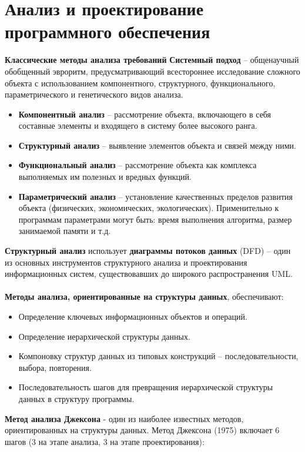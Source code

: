 \documentclass[a4paper, 12pt]{report}
\numberwithin{equation}{section}
\begin{document}
    \section{Анализ и проектирование программного обеспечения}
    \textbf{Классические методы анализа требований}
    \textbf{Системный подход} – общенаучный обобщенный эвроритм, предусматривающий всестороннее исследование сложного объекта с использованием компонентного, структурного, функционального, параметрического и генетического видов анализа.
        \begin{itemize}
            \item \textbf{Компонентный анализ} -- рассмотрение объекта, включающего в себя составные элементы и входящего в систему более высокого ранга.
            \item \textbf{Структурный анализ} -- выявление элементов объекта и связей между ними. 
            \item \textbf{Функциональный анализ} -- рассмотрение объекта как комплекса выполняемых им полезных и вредных функций.
            \item \textbf{Параметрический анализ} -- установление качественных пределов развития объекта (физических, экономических, экологических). Применительно к программам параметрами могут быть: время выполнения алгоритма, размер занимаемой памяти и т.д.
        \end{itemize}
    \textbf{Структурный анализ} использует \textbf{диаграммы потоков данных} (DFD) -- один из основных инструментов структурного анализа и проектирования информационных систем, существовавших до широкого распространения UML.
    \\\\
    \textbf{Методы анализа, ориентированные на структуры данных}, обеспечивают:
    \begin{itemize}
        \item Определение ключевых информационных объектов и операций.
        \item Определение иерархической структуры данных.
        \item Компоновку структур данных из типовых конструкций -- последовательности, выбора, повторения.
        \item Последовательность шагов для превращения иерархической структуры данных в структуру программы.
    \end{itemize}
    \textbf{Метод анализа Джексона} - один из наиболее известных методов, ориентированных на структуры данных. Метод Джексона (1975) включает 6 шагов (3 на этапе анализа, 3 на этапе проектирования):
\end{document}
